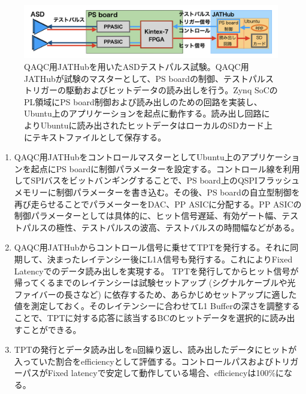 \begin{figure} 
\centering
\includegraphics[width=16cm]{fig/QAQC/QAQCasdtp.png}
\caption[QAQC用JATHubを用いたASDテストパルス試験]{QAQC用JATHubを用いたASDテストパルス試験。QAQC用JATHubが試験のマスターとして、PS boardの制御、テストパルストリガーの駆動およびヒットデータの読み出しを行う。Zynq SoCのPL領域にPS board制御および読み出しのための回路を実装し、Ubuntu上のアプリケーションを起点に動作する。読み出し回路によりUbuntuに読み出されたヒットデータはローカルのSDカード上にテキストファイルとして保存する。}
\label{QAQCasdtp}
\end{figure}

\begin{enumerate}
    \item QAQC用JATHubをコントロールマスターとしてUbuntu上のアプリケーションを起点にPS boardに制御パラメーターを設定する。コントロール線を利用してSPIバスをビットバンギングすることで、PS board上のQSPIフラッシュメモリーに制御パラメーターを書き込む。その後、PS boardの自立型制御を再び走らせることでパラメーターをDAC、PP ASICに分配する。PP ASICの制御パラメーターとしては具体的に、ヒット信号遅延、有効ゲート幅、テストパルスの極性、テストパルスの波高、テストバルスの時間幅などがある。
    \baselineskip

    \item QAQC用JATHubからコントロール信号に乗せてTPTを発行する。それに同期して、決まったレイテンシー後にL1A信号も発行する。これによりFixed Latencyでのデータ読み出しを実現する。
    TPTを発行してからヒット信号が帰ってくるまでのレイテンシーは試験セットアップ (シグナルケーブルや光ファイバーの長さなど) に依存するため、あらかじめセットアップに適した値を測定しておく。そのレイテンシーに合わせてL1 Bufferの深さを調整することで、TPTに対する応答に該当するBCのヒットデータを選択的に読み出すことができる。
    \baselineskip

    \item TPTの発行とデータ読み出しをn回繰り返し、読み出したデータにヒットが入っていた割合をefficiencyとして評価する。コントロールパスおよびトリガーパスがFixed latencyで安定して動作している場合、efficiencyは100\%になる。
    \baselineskip

\end{enumerate}

